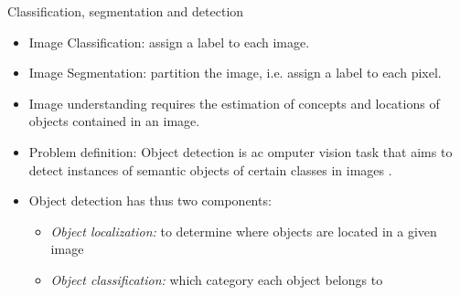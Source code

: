 \documentclass[xcolor=pdftex,dvipsnames,table]{beamer}
\begin{document}
\begin{frame}{Classification, segmentation and detection}
\begin{itemize}
	\item Image Classification: assign a label to each image. 
	\item Image Segmentation: partition the image, i.e. assign a label to each pixel.
	\item Image understanding requires the estimation of concepts and locations of objects contained in an image.
	\item Problem definition: Object detection is ac omputer vision task that aims to detect instances of semantic objects of certain classes in images \cite{Ren2017, Zhao2019}.
	\item Object detection has thus two components:
	\begin{itemize}
		\item \textit{Object localization:} to determine where objects are located in a given image
		\item \textit{Object classification:} which category each object belongs to
	\end{itemize}
\end{itemize}
\end{frame}
\end{document}
